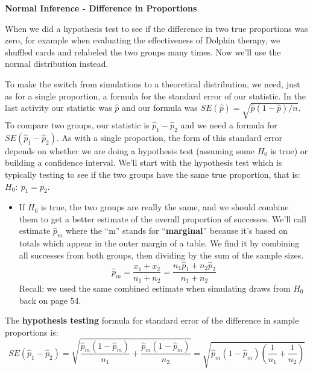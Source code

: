 \def\theTopic{Difference in Proportions - Z }
\def\dayNum{22 }


\begin{center}
{\bf {\large \textbf{Normal Inference - Difference in Proportions}}}
\end{center}


When we did a hypothesis test to see if the difference in  two true
proportions was zero,  for example when evaluating the effectiveness
of Dolphin therapy, we shuffled cards and relabeled the two groups many
times. Now we'll use the normal distribution instead.  
  

 To make the switch from simulations to a theoretical distribution,
 we need, just as for a single proportion, a formula for the standard
 error of our statistic.  In the last activity our statistic was
 $\widehat{p}$ and our formula was $SE(\widehat{p}) =
 \sqrt{\widehat{p}(1-\widehat{p})/n}$.  To compare two groups, our 
statistic is $\widehat{p}_1 - \widehat{p}_2$ and we need a formula for
$SE(\widehat{p}_1 - \widehat{p}_2)$. As with a single proportion, the
form of this standard error depends on whether we are doing a
hypothesis test (assuming some $H_0$ is true) or building a confidence
interval.  We'll start with the hypothesis test which is typically
testing to see if the two groups have the same true proportion, that
is:  $H_0:\ p_1 = p_2$.
 \begin{itemize}
 \item If $H_0$ is true, the two groups are really the same, and we
   should combine them to get a better estimate of the overall
   proportion of successes. We'll call estimate $\widehat{p}_m$ where
   the ``m'' stands for ``{\bf marginal}'' because it's
   based on totals which appear in the outer margin of a table.  We
   find it by combining all successes from both 
   groups, then dividing by the sum of the sample sizes. 
  $$\widehat{p}_m = \frac{x_1 + x_2}{n_1+n_2} = \frac{n_1\widehat{p}_1
    + n_2\widehat{p}_2}{n_1 + n_2}$$ 
  Recall:  we used the same combined estimate when simulating draws
  from $H_0$ back on page 54.
 \end{itemize}

 The {\bf hypothesis testing} formula for standard error of the difference in sample proportions is:
 $$SE(\widehat{p}_1 - \widehat{p}_2) =
 \sqrt{\frac{\widehat{p}_m(1-\widehat{p}_m)}{n_1} +
   \frac{\widehat{p}_m(1-\widehat{p}_m)}{n_2}} =
  \sqrt{\widehat{p}_m(1-\widehat{p}_m)\left(\frac{1}{n_1} +
   \frac{1}{n_2}\right)}$$



